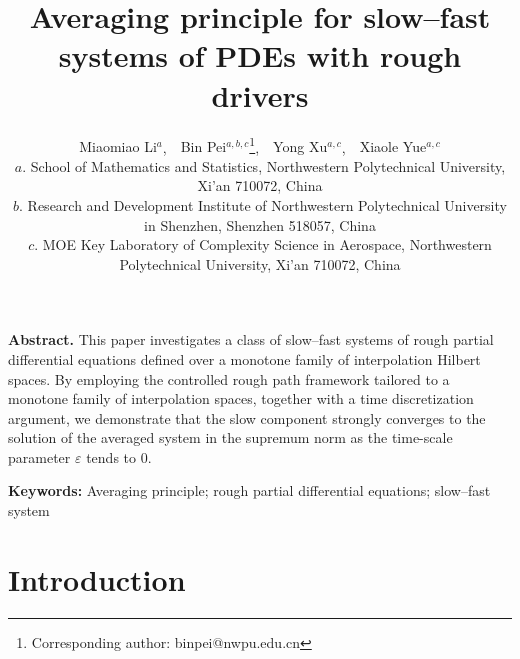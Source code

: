 \documentclass[10pt,a4paper]{article}
\numberwithin{equation}{section}
\begin{document}
\title{{\Large \bf Averaging principle for slow--fast systems of PDEs with rough drivers }}
\author{{Miaomiao Li$^{a}$},~~{Bin Pei$^{a,b,c}$}\footnote{Corresponding author: binpei@nwpu.edu.cn},~~{Yong Xu$^{a,c}$},~~{Xiaole Yue$^{a,c}$}
	\\
	\scriptsize $a.$ School of Mathematics and Statistics, Northwestern Polytechnical University, Xi'an 710072, China \\
    \scriptsize $b.$ Research and Development Institute of Northwestern Polytechnical University in Shenzhen, Shenzhen 518057, China \\
    \scriptsize $c.$ MOE Key Laboratory of Complexity Science in Aerospace, Northwestern Polytechnical University, Xi'an 710072, China }


\date{}
\maketitle
\begin{center}
	\begin{minipage}{145mm}
		
		{\bf Abstract.} This paper investigates a class of slow--fast systems of rough partial differential equations defined over a monotone family of interpolation Hilbert spaces. By employing the controlled rough path framework tailored to a monotone family of interpolation spaces, together with a time discretization argument, we demonstrate that the slow component strongly converges to the solution of the averaged system in the supremum norm as the time-scale parameter $\varepsilon$ tends to $0$.

		
		
\vspace{3mm} {\bf Keywords:} Averaging principle; rough partial differential equations; slow--fast system
	
		
		
		
	\end{minipage}
\end{center}


\tableofcontents


\section{Introduction}
\end{document}
